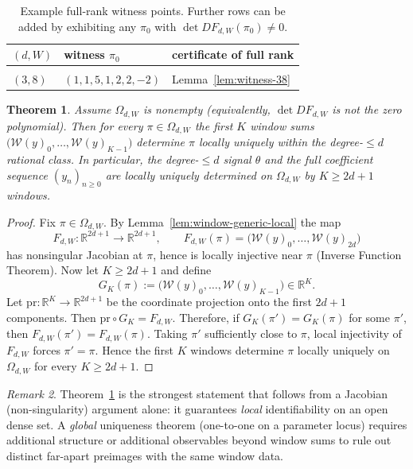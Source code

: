 \documentclass[11pt,reqno]{amsart}
\newtheorem{theorem}{Theorem}[section]
\theoremstyle{definition}
\theoremstyle{remark}
\newtheorem{remark}[theorem]{Remark} %
\newcommand{\R}{\mathbb{R}}
\newcommand{\1}{\mathbf{1}}
\begin{document}
\begin{table}[t]
	\centering
	\begin{tabular}{lll}
		\hline
		$(d,W)$ & witness $\pi_0$ & certificate of full rank \\
		\hline \\
		$(3,8)$ & $(1,1,5,1,2,2,-2)$ & Lemma~\ref{lem:witness-38} \\
		\hline
	\end{tabular}
	\begingroup
	\captionsetup{font=footnotesize}
	\caption{Example full-rank witness points. Further rows can be added by exhibiting any $\pi_0$ with $\det DF_{d,W}(\pi_0)\neq 0$.}
	\endgroup
\end{table}





\begin{theorem}\label{thm:window-ident-general}
Assume $\Omega_{d,W}$ is nonempty (equivalently, $\det DF_{d,W}$ is not the zero polynomial).
Then for every $\pi\in\Omega_{d,W}$ the first $K$ window sums $\bigl(\mathcal W(y)_0,\dots,\mathcal W(y)_{K-1}\bigr)$
determine $\pi$ locally uniquely within the degree-$\le d$ rational class. In particular, the
degree-$\le d$ signal $\theta$ and the full coefficient sequence $(y_n)_{n\ge 0}$ are locally
uniquely determined on $\Omega_{d,W}$ by $K\ge 2d+1$ windows.
\end{theorem}

\begin{proof}
Fix $\pi\in\Omega_{d,W}$. By Lemma~\ref{lem:window-generic-local} the map
\[
F_{d,W}:\R^{2d+1}\to\R^{2d+1},\qquad
F_{d,W}(\pi)=\bigl(\mathcal W(y)_0,\dots,\mathcal W(y)_{2d}\bigr)
\]
has nonsingular Jacobian at $\pi$, hence is locally injective near $\pi$ (Inverse Function Theorem).
Now let $K\ge 2d+1$ and define
\[
G_{K}(\pi):=\bigl(\mathcal W(y)_0,\dots,\mathcal W(y)_{K-1}\bigr)\in\R^{K}.
\]
Let $\mathrm{pr}:\R^{K}\to\R^{2d+1}$ be the coordinate projection onto the first $2d+1$ components.
Then $\mathrm{pr}\circ G_{K}=F_{d,W}$. Therefore, if $G_{K}(\pi')=G_{K}(\pi)$ for some $\pi'$,
then $F_{d,W}(\pi')=F_{d,W}(\pi)$. Taking $\pi'$ sufficiently close to $\pi$, local injectivity of
$F_{d,W}$ forces $\pi'=\pi$. Hence the first $K$ windows determine $\pi$ locally uniquely on
$\Omega_{d,W}$ for every $K\ge 2d+1$.
\end{proof}

\begin{remark}\label{rem:window-global}
Theorem~\ref{thm:window-ident-general} is the strongest statement that follows from a Jacobian
(non-singularity) argument alone: it guarantees \emph{local} identifiability on an open dense set.
A \emph{global} uniqueness theorem (one-to-one on a parameter locus) requires additional structure or
additional observables beyond window sums to rule out distinct far-apart preimages with the same window data.
\end{remark}
\end{document}
